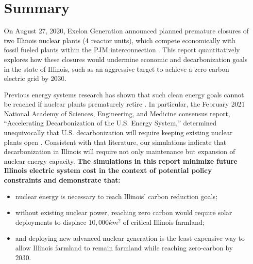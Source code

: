 \section{Summary}
On August 27, 2020, Exelon Generation announced planned premature closures of 
two Illinois nuclear plants (4 reactor units), which compete economically with 
fossil fueled plants within the \gls{PJM} interconnection \cite{larson_exelon_2020}. 
This report quantitatively explores how these closures would undermine economic 
and decarbonization goals in the state of Illinois, such as an aggressive 
target to achieve a zero carbon electric grid by 2030.

Previous energy systems research has shown that such clean energy goals cannot 
be reached if nuclear plants prematurely retire 
\cite{national_academies_of_sciences_engineering_and_medicine_2021_accelerating_2021,larson_net-zero_2020,davis_net-zero_2018}.  
In particular, the February 2021 National Academy of Sciences, Engineering, and 
Medicine consensus report, ``Accelerating Decarbonization of the U.S. Energy 
System,'' determined unequivocally that U.S. decarbonization will require keeping 
existing nuclear plants open 
\cite{national_academies_of_sciences_engineering_and_medicine_2021_accelerating_2021}. 
Consistent with that literature, our simulations indicate that decarbonization 
in Illinois will require not only maintenance but expansion of nuclear energy capacity. 
\textbf{The simulations in this report minimize future Illinois electric system 
cost in the context of potential policy constraints and demonstrate that:}

\begin{itemize}
        \item nuclear energy is necessary to reach Illinois' carbon reduction 
                goals;
        \item without existing nuclear power, reaching zero carbon would 
                require solar deployments to displace $10,000km^2$ of critical 
                Illinois 
                farmland;
        \item and deploying new advanced nuclear generation is the least expensive way to 
                allow Illinois farmland to remain farmland while reaching 
                zero-carbon by 2030.
  \end{itemize}

